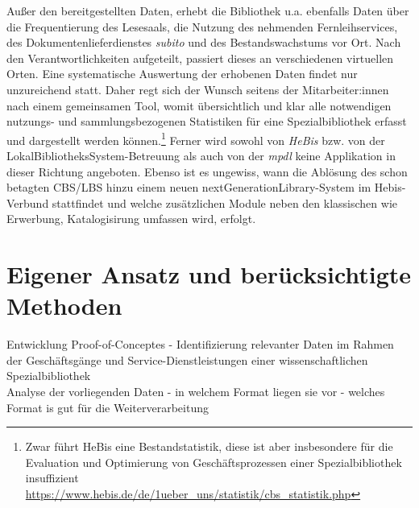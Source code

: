 \documentclass[10pt,a4paper,twocolumn,conference]{IEEEtran}
\begin{document}
Außer den bereitgestellten Daten, erhebt die Bibliothek u.a. ebenfalls Daten über
die Frequentierung des Lesesaals, die Nutzung des nehmenden Fernleihservices, des
Dokumentenlieferdienstes \textit{subito} und des Bestandswachstums vor Ort.
Nach den Verantwortlichkeiten aufgeteilt, passiert dieses an verschiedenen virtuellen Orten. 
Eine systematische Auswertung der erhobenen Daten findet nur unzureichend statt. 
Daher regt sich der Wunsch seitens der Mitarbeiter:innen nach einem gemeinsamen Tool, 
womit übersichtlich und klar alle notwendigen nutzungs- und sammlungsbezogenen Statistiken für eine 
Spezialbibliothek erfasst und dargestellt werden können.\footnote{Zwar führt HeBis eine Bestandstatistik, diese ist aber insbesondere für die
Evaluation und Optimierung von Geschäftsprozessen einer Spezialbibliothek
insuffizient \url{https://www.hebis.de/de/1ueber_uns/statistik/cbs_statistik.php}}
Ferner wird sowohl von \textit{HeBis} bzw. von der
LokalBibliotheksSystem-Betreuung als auch von der \textit{mpdl} keine Applikation
in dieser Richtung angeboten.
Ebenso ist es ungewiss, wann die Ablösung des schon betagten CBS/LBS hinzu
einem neuen nextGenerationLibrary-System im Hebis-Verbund stattfindet und
welche zusätzlichen Module neben den klassischen wie Erwerbung, Katalogisirung
umfassen wird, erfolgt.







\section{Eigener Ansatz und berücksichtigte Methoden}
Entwicklung Proof-of-Conceptes - Identifizierung relevanter Daten im Rahmen der
Geschäftsgänge und Service-Dienstleistungen einer wissenschaftlichen Spezialbibliothek\\
Analyse der vorliegenden Daten - in welchem Format liegen sie vor - welches
Format is gut für die Weiterverarbeitung\\
\end{document}
